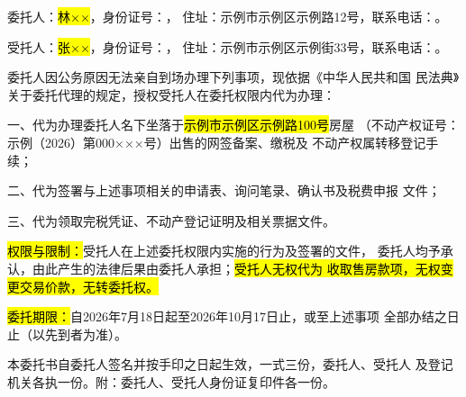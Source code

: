 \documentclass[zihao=-4]{ctexart}
\begin{document}

委托人：\hl{林××}，身份证号：，
住址：示例市示例区示例路12号，联系电话：。

受托人：\hl{张××}，身份证号：，
住址：示例市示例区示例街33号，联系电话：。

委托人因公务原因无法亲自到场办理下列事项，现依据《中华人民共和国
民法典》关于委托代理的规定，授权受托人在委托权限内代为办理：

一、代为办理委托人名下坐落于\hl{示例市示例区示例路100号}房屋
（不动产权证号：示例（2026）第000×××号）出售的网签备案、缴税及
不动产权属转移登记手续；

二、代为签署与上述事项相关的申请表、询问笔录、确认书及税费申报
文件；

三、代为领取完税凭证、不动产登记证明及相关票据文件。

\hl{权限与限制：}受托人在上述委托权限内实施的行为及签署的文件，
委托人均予承认，由此产生的法律后果由委托人承担；\hl{受托人无权代为
收取售房款项，无权变更交易价款，无转委托权。}

\hl{委托期限：}自2026年7月18日起至2026年10月17日止，或至上述事项
全部办结之日止（以先到者为准）。

本委托书自委托人签名并按手印之日起生效，一式三份，委托人、受托人
及登记机关各执一份。附：委托人、受托人身份证复印件各一份。

\vspace{0.8\baselineskip}
\end{document}
